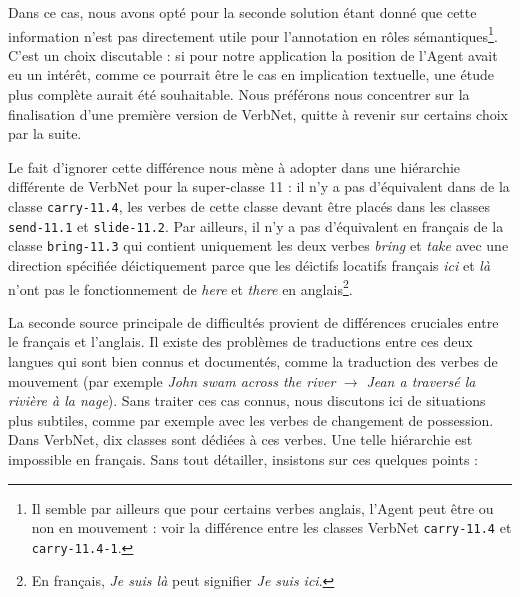 Dans ce cas, nous avons opté pour la seconde solution étant donné que cette
information n'est pas directement utile pour l'annotation en rôles
sémantiques\footnote{Il semble par ailleurs que pour certains verbes anglais,
    l'Agent peut être ou non en mouvement : voir la différence entre les
classes VerbNet {\color{blue}\texttt{carry-11.4}} et
{\color{blue}\texttt{carry-11.4-1}}.}.  C'est un choix discutable : si pour
notre application la position de l'Agent avait eu un intérêt, comme ce pourrait
être le cas en implication textuelle, une étude plus complète aurait été
souhaitable. Nous préférons nous concentrer sur la finalisation d'une première
version de VerbNet, quitte à revenir sur certains choix par la suite.

Le fait d'ignorer cette différence nous mène à adopter dans \verbenet{} une
hiérarchie différente de VerbNet pour la super-classe 11 : il n'y a pas
d'équivalent dans \verbenet{} de la classe {\color{blue}\texttt{carry-11.4}}, les verbes
de cette classe devant être placés dans les classes {\color{blue}\texttt{send-11.1}} et
{\color{blue}\texttt{slide-11.2}}. Par ailleurs, il n'y a pas d'équivalent en français
de la classe {\color{blue}\texttt{bring-11.3}} qui contient uniquement les deux verbes
\textit{bring} et \textit{take} avec une direction spécifiée déictiquement
\citep[page 135]{levin1993english} parce que les déictifs locatifs français
\textit{ici} et \textit{là} n'ont pas le fonctionnement de \textit{here} et
\textit{there} en anglais\footnote{En français, \textit{Je suis là} peut signifier
\textit{Je suis ici}.}.

La seconde source principale de difficultés provient de différences cruciales
entre le français et l'anglais. Il existe des problèmes de traductions entre
ces deux langues qui sont bien connus et documentés, comme la traduction des
verbes de mouvement (par exemple \textit{John swam across the river}
$\rightarrow$ \textit{Jean a traversé la rivière à la nage}). Sans traiter ces
cas connus, nous discutons ici de situations plus subtiles, comme par exemple
avec les verbes de changement de possession. Dans VerbNet, dix classes sont
dédiées à ces verbes. Une telle hiérarchie est impossible en français. Sans
tout détailler, insistons sur ces quelques points :


